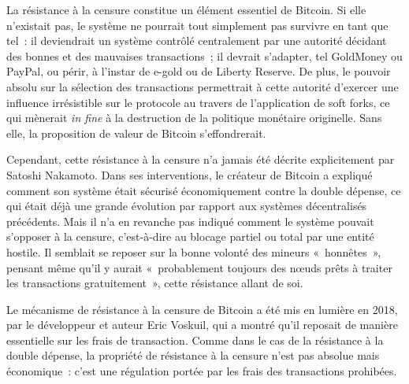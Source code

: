La résistance à la censure constitue un élément essentiel de Bitcoin. Si elle n'existait pas, le système ne pourrait tout simplement pas survivre en tant que tel~: il deviendrait un système contrôlé centralement par une autorité décidant des bonnes et des mauvaises transactions~; il devrait s'adapter, tel GoldMoney ou PayPal, ou périr, à l'instar de e-gold ou de Liberty Reserve. De plus, le pouvoir absolu sur la sélection des transactions permettrait à cette autorité d'exercer  une influence irrésistible sur le protocole au travers de l'application de soft forks, ce qui mènerait \emph{in fine} à la destruction de la politique monétaire originelle. Sans elle, la proposition de valeur de Bitcoin s'effondrerait.

Cependant, cette résistance à la censure n'a jamais été décrite explicitement par Satoshi Nakamoto. Dans ses interventions, le créateur de Bitcoin a expliqué comment son système était sécurisé économiquement contre la double dépense, ce qui était déjà une grande évolution par rapport aux systèmes décentralisés précédents. Mais il n'a en revanche pas indiqué comment le système pouvait s'opposer à la censure, c'est-à-dire au blocage partiel ou total par une entité hostile. Il semblait se reposer sur la bonne volonté des mineurs «~honnêtes~», pensant même qu'il y aurait «~probablement toujours des nœuds prêts à traiter les transactions gratuitement~», cette résistance allant de soi.

Le mécanisme de résistance à la censure de Bitcoin a été mis en lumière en 2018, par le développeur et auteur Eric Voskuil, qui a montré qu'il reposait de manière essentielle sur les frais de transaction. Comme dans le cas de la résistance à la double dépense, la propriété de résistance à la censure n'est pas absolue mais économique~: c'est une régulation portée par les frais des transactions prohibées.

